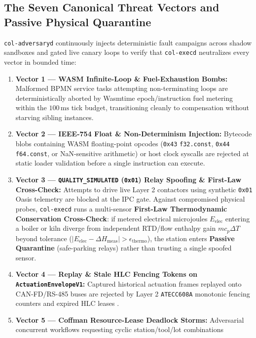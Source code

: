 \subsection{The Seven Canonical Threat Vectors and Passive Physical Quarantine}

\texttt{col-adversaryd} continuously injects deterministic fault campaigns across shadow sandboxes and gated live canary loops to verify that
\texttt{col-execd} neutralizes every vector in bounded time:
\begin{enumerate}
    \item \textbf{Vector 1 --- WASM Infinite-Loop \& Fuel-Exhaustion Bombs:} Malformed BPMN service tasks attempting non-terminating loops are
    deterministically aborted by Wasmtime epoch/instruction fuel metering \parencite{haas2017wasm} within the $100\,\mathrm{ms}$ tick budget,
    transitioning cleanly to compensation without starving sibling instances.
    \item \textbf{Vector 2 --- IEEE-754 Float \& Non-Determinism Injection:} Bytecode blobs containing WASM floating-point opcodes (\texttt{0x43}
    \texttt{f32.const}, \texttt{0x44} \texttt{f64.const}, or NaN-sensitive arithmetic) or host clock syscalls are rejected at static loader validation
    before a single instruction can execute.
    \item \textbf{Vector 3 --- \texttt{QUALITY\_SIMULATED} (\texttt{0x01}) Relay Spoofing \& First-Law Cross-Check:} Attempts to drive live Layer 2
    contactors using synthetic \texttt{0x01} Oasis telemetry are blocked at the IPC gate. Against compromised physical probes, \texttt{col-execd} runs a
    multi-sensor \textbf{First-Law Thermodynamic Conservation Cross-Check}: if metered electrical microjoules $E_{\mathrm{elec}}$ entering a boiler or
    kiln diverge from independent RTD/flow enthalpy gain $m c_p \Delta T$ beyond tolerance
    ($|E_{\mathrm{elec}} - \Delta H_{\mathrm{meas}}| > \epsilon_{\mathrm{thermo}}$), the station enters \textbf{Passive Quarantine} (safe-parking
    relays) rather than trusting a single spoofed sensor.
    \item \textbf{Vector 4 --- Replay \& Stale HLC Fencing Tokens on \texttt{ActuationEnvelopeV1}:} Captured historical actuation frames replayed onto
    CAN-FD/RS-485 buses are rejected by Layer 2 \texttt{ATECC608A} monotonic fencing counters and expired HLC leases
    \parencite{kulkarni2014logical,lamport1978time}.
    \item \textbf{Vector 5 --- Coffman Resource-Lease Deadlock Storms:} Adversarial concurrent workflows requesting cyclic station/tool/lot combinations

\end{enumerate}
